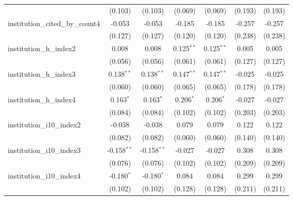 \begin{tabular}{lcccccc}
                                         & (0.103)       & (0.103)       & (0.069)       & (0.069)       & (0.193)       & (0.193)\\   
   institution\_cited\_by\_count4        & -0.053        & -0.053        & -0.185        & -0.185        & -0.257        & -0.257\\   
                                         & (0.127)       & (0.127)       & (0.120)       & (0.120)       & (0.238)       & (0.238)\\   
   institution\_h\_index2                & 0.008         & 0.008         & 0.125$^{**}$  & 0.125$^{**}$  & 0.005         & 0.005\\   
                                         & (0.056)       & (0.056)       & (0.061)       & (0.061)       & (0.127)       & (0.127)\\   
   institution\_h\_index3                & 0.138$^{**}$  & 0.138$^{**}$  & 0.147$^{**}$  & 0.147$^{**}$  & -0.025        & -0.025\\   
                                         & (0.060)       & (0.060)       & (0.065)       & (0.065)       & (0.178)       & (0.178)\\   
   institution\_h\_index4                & 0.163$^{*}$   & 0.163$^{*}$   & 0.206$^{*}$   & 0.206$^{*}$   & -0.027        & -0.027\\   
                                         & (0.084)       & (0.084)       & (0.102)       & (0.102)       & (0.203)       & (0.203)\\   
   institution\_i10\_index2              & -0.038        & -0.038        & 0.079         & 0.079         & 0.122         & 0.122\\   
                                         & (0.082)       & (0.082)       & (0.060)       & (0.060)       & (0.140)       & (0.140)\\   
   institution\_i10\_index3              & -0.158$^{**}$ & -0.158$^{**}$ & -0.027        & -0.027        & 0.308         & 0.308\\   
                                         & (0.076)       & (0.076)       & (0.102)       & (0.102)       & (0.209)       & (0.209)\\   
   institution\_i10\_index4              & -0.180$^{*}$  & -0.180$^{*}$  & 0.084         & 0.084         & 0.299         & 0.299\\   
                                         & (0.102)       & (0.102)       & (0.128)       & (0.128)       & (0.211)       & (0.211)\\   

\end{tabular}
